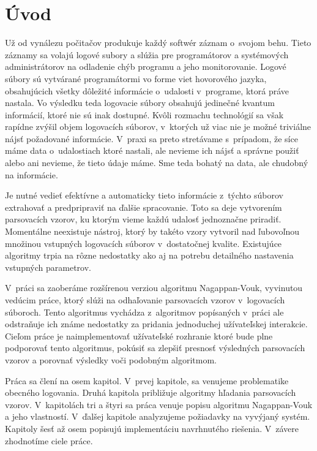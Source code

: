 \chapter*{Úvod}

Už od vynálezu počitačov produkuje každý softwér záznam o~svojom behu. Tieto záznamy sa volajú logové subory a slúžia pre programátorov a systémových administrátorov na odladenie chýb programu a jeho monitorovanie. Logové súbory sú vytvárané programátormi vo forme viet hovorového jazyka, obsahujúcich všetky dôležité informácie o~udalosti v~programe, ktorá práve nastala. Vo výsledku teda logovacie súbory obsahujú jedinečné kvantum informácií, ktoré nie sú inak dostupné. Kvôli rozmachu technológií sa však rapídne zvýšil objem logovacích súborov, v~ktorých už viac nie je možné triviálne nájsť požadované informácie. V~praxi sa preto stretávame s~prípadom, že síce máme data o~udalostiach ktoré nastali, ale nevieme ich nájsť a správne použiť alebo ani nevieme, že tieto údaje máme. Sme teda bohatý na data, ale chudobný na informácie.
\par Je nutné vedieť efektívne a automaticky tieto informácie z~týchto súborov extrahovať a predpripraviť na ďalšie spracovanie. Toto sa deje vytvorením parsovacích vzorov, ku ktorým vieme každú udalosť jednoznačne priradiť. Momentálne neexistuje nástroj, ktorý by takéto vzory vytvoril nad ľubovoľnou množinou vstupných logovacích súborov v~dostatočnej kvalite. Existujúce algoritmy trpia na rôzne nedostatky ako aj na potrebu detailného nastavenia vstupných parametrov.
\par V~práci sa zaoberáme rozšírenou verziou algoritmu Nagappan-Vouk, vyvinutou vedúcim práce, ktorý slúži na odhaľovanie parsovacích vzorov v~logovacích súboroch. Tento algoritmus vychádza z~algoritmov popísaných v~práci ale odstraňuje ich  známe nedostatky za pridania jednoduchej užívateľskej interakcie. Cieľom práce je naimplementovať užívateľské rozhranie ktoré bude plne podporovať tento algoritmus, pokúsiť sa zlepšiť presnosť výsledných parsovacích vzorov a porovnať výsledky voči podobným algoritmom.
 \par Práca sa člení na osem kapitol. V~prvej kapitole, sa venujeme problematike obecného logovania. Druhá kapitola približuje algoritmy hľadania parsovacích vzorov. V~kapitolách tri a štyri sa práca venuje popisu algoritmu Nagappan-Vouk a jeho vlastností. V~ďalšej kapitole analyzujeme požiadavky na vyvýjaný systém. Kapitoly šesť až osem popisujú implementáciu navrhnutého riešenia. V~závere zhodnotíme ciele práce.